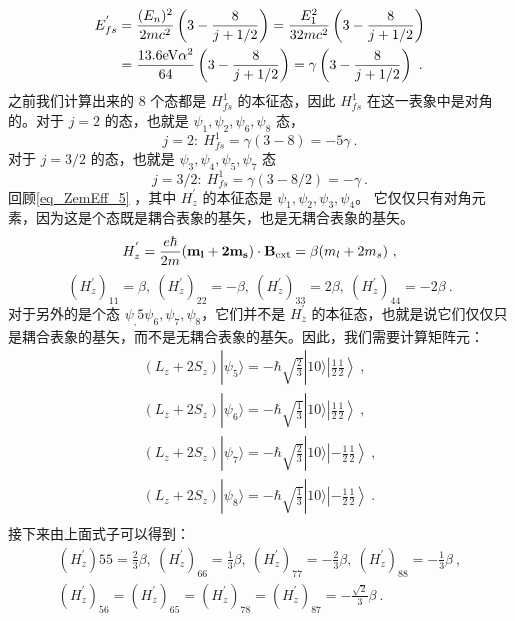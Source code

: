 \begin{align}
E_{fs}^{'}&=\frac{(E_n)^2}{2mc^2}\left(3-\frac{8}{j+1/2}\right)=\frac{E_1^2}{32mc^2}\left(3-\frac{8}{j+1/2}\right)\\
&=\frac{13.6\rm{eV}\alpha^2}{64}\left(3-\frac{8}{j+1/2}\right)=\gamma\left(3-\frac{8}{j+1/2}\right)~.
\end{align}
之前我们计算出来的 $8$ 个态都是 $H_{fs}^1$ 的本征态，因此 $H_{fs}^1$ 在这一表象中是对角的。对于 $j=2$ 的态，也就是 $\psi_1,\psi_2,\psi_6,\psi_8$ 态，
\begin{equation}
j=2: \ H_{fs}^1=\gamma(3-8)=-5\gamma~.
\end{equation}
对于 $j=3/2$ 的态，也就是 $\psi_3,\psi_4,\psi_5,\psi_7$ 态
\begin{equation}
j=3/2: \ H_{fs}^1=\gamma(3-8/2)=-\gamma~.
\end{equation}
回顾\autoref{eq_ZemEff_5} ，其中 $H_z^{'}$ 的本征态是 $\psi_1,\psi_2,\psi_3,\psi_4$。 它仅仅只有对角元素，因为这是个态既是耦合表象的基矢，也是无耦合表象的基矢。
\begin{equation}
H_z^{'} = \frac{e\hbar}{2m}(\mathbf{m_l+2m_s})\cdot \mathbf{B}_{\rm{ext}}=\beta(m_l+2m_s)~,
\end{equation}
\begin{equation}
(H_z^{'})_{11}=\beta,\ (H_z^{'})_{22}=-\beta,\ (H_z^{'})_{33}=2\beta,\ (H_z^{'})_{44}=-2\beta~.
\end{equation}
对于另外的是个态 $\psi_,5\psi_6,\psi_7,\psi_8$，它们并不是 $H_{z}^{'}$ 的本征态，也就是说它们仅仅只是耦合表象的基矢，而不是无耦合表象的基矢。因此，我们需要计算矩阵元：
\begin{align}
(L_z+2S_z)|\psi_5\rangle= -\hbar\sqrt{\frac{2}{3}}|10\rangle\left|\frac{1}{2}\frac{1}{2}\right\rangle~,\\
(L_z+2S_z)|\psi_6\rangle=-\hbar\sqrt{\frac{1}{3}}|10\rangle\left|\frac{1}{2}\frac{1}{2}\right\rangle ~,\\
(L_z+2S_z)|\psi_7\rangle=-\hbar\sqrt{\frac{2}{3}}|10\rangle\left|-\frac{1}{2}\frac{1}{2}\right\rangle ~,\\
(L_z+2S_z)|\psi_8\rangle= -\hbar\sqrt{\frac{1}{3}}|10\rangle\left|-\frac{1}{2}\frac{1}{2}\right\rangle~.\\
\end{align}
接下来由上面式子可以得到：
\begin{align}
(H_z^{'}){55}=\frac{2}{3}\beta,\ (H_z^{'})_{66}=\frac{1}{3}\beta,\ (H_z^{'})_{77}=-\frac{2}{3}\beta,\ (H_z^{'})_{88}=-\frac{1}{3}\beta~,\\
(H_z^{'})_{56}=(H_z^{'})_{65}=(H_z^{'})_{78}=(H_z^{'})_{87}=-\frac{\sqrt{2}}{3}\beta~.
\end{align}

